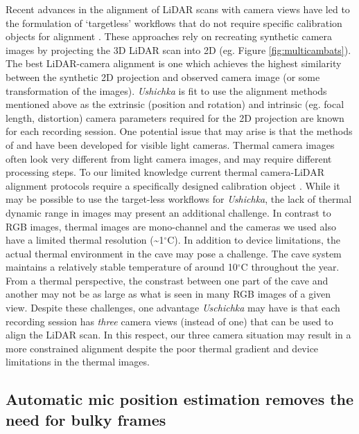 \documentclass[
]{book}
\begin{document}
Recent advances in the alignment of LiDAR scans with camera views have led to the formulation of `targetless' workflows that do not require specific calibration objects for alignment \citep{kang2020automatic, munozbanon2020}. These approaches rely on recreating synthetic camera images by projecting the 3D LiDAR scan into 2D (eg. Figure \ref{fig:multicambats}). The best LiDAR-camera alignment is one which achieves the highest similarity between the synthetic 2D projection and observed camera image (or some transformation of the images). \emph{Ushichka} is fit to use the alignment methods mentioned above as the extrinsic (position and rotation) and intrinsic (eg. focal length, distortion) camera parameters required for the 2D projection are known for each recording session. One potential issue that may arise is that the methods of \citet{kang2020automatic} and \citet{munozbanon2020} have been developed for visible light cameras. Thermal camera images often look very different from light camera images, and may require different processing steps. To our limited knowledge current thermal camera-LiDAR alignment protocols require a specifically designed calibration object \citep{krishnan2017cross, slatcalib, zhangcalib}. While it may be possible to use the target-less workflows for \emph{Ushichka}, the lack of thermal dynamic range in images may present an additional challenge. In contrast to RGB images, thermal images are mono-channel and the cameras we used also have a limited thermal resolution (\textasciitilde1\(^{\circ}\)C). In addition to device limitations, the actual thermal environment in the cave may pose a challenge. The cave system maintains a relatively stable temperature of around 10\(^{\circ}\)C throughout the year. From a thermal perspective, the constrast between one part of the cave and another may not be as large as what is seen in many RGB images of a given view. Despite these challenges, one advantage \emph{Uschichka} may have is that each recording session has \emph{three} camera views (instead of one) that can be used to align the LiDAR scan. In this respect, our three camera situation may result in a more constrained alignment despite the poor thermal gradient and device limitations in the thermal images.

\hypertarget{automatic-mic-position-estimation-removes-the-need-for-bulky-frames}{%
\subsection{Automatic mic position estimation removes the need for bulky frames}\label{automatic-mic-position-estimation-removes-the-need-for-bulky-frames}}
\end{document}
